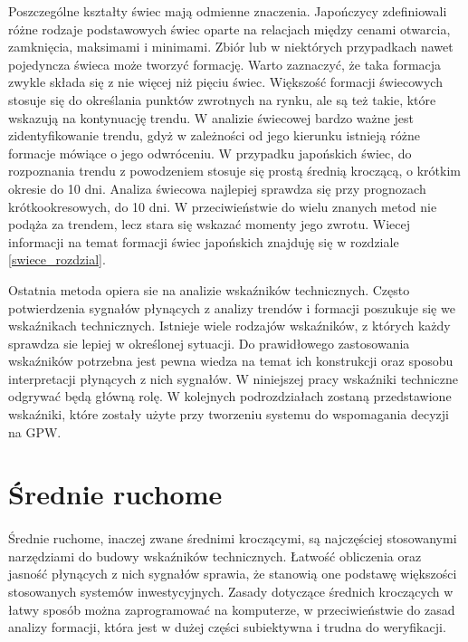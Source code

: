 \documentclass[pdflatex,11pt]{aghdpl}
\begin{document}
Poszczególne kształty świec mają odmienne znaczenia. Japończycy zdefiniowali różne rodzaje podstawowych świec oparte na relacjach między cenami otwarcia, zamknięcia, maksimami i minimami. Zbiór lub w niektórych przypadkach nawet pojedyncza świeca może tworzyć formację. Warto zaznaczyć, że taka formacja zwykle składa się z nie więcej niż pięciu świec. Większość formacji świecowych stosuje się do określania punktów zwrotnych na rynku, ale są też takie, które wskazują na kontynuację trendu. W analizie świecowej bardzo ważne jest zidentyfikowanie trendu, gdyż w zależności od jego kierunku istnieją różne formacje mówiące o jego odwróceniu. W przypadku japońskich świec, do rozpoznania trendu z powodzeniem stosuje się prostą średnią kroczącą, o krótkim okresie do 10 dni. Analiza świecowa najlepiej sprawdza się przy prognozach krótkookresowych, do 10 dni. W przeciwieństwie do wielu znanych metod nie podąża za trendem, lecz stara się wskazać momenty jego zwrotu. Wiecej informacji na temat formacji świec japońskich znajduję się w rozdziale \ref{swiece_rozdzial}.

Ostatnia metoda opiera sie na analizie wskaźników technicznych. Często potwierdzenia sygnałów płynących z analizy trendów i formacji poszukuje się we wskaźnikach technicznych. Istnieje wiele rodzajów wskaźników, z których każdy sprawdza sie lepiej w określonej sytuacji. Do prawidłowego zastosowania wskaźników potrzebna jest pewna wiedza na temat ich konstrukcji oraz sposobu interpretacji płynących z nich sygnałów. W niniejszej pracy wskaźniki techniczne odgrywać będą główną rolę. W kolejnych podrozdziałach zostaną przedstawione wskaźniki, które zostały użyte przy tworzeniu systemu do wspomagania decyzji na GPW. 
\section{Średnie ruchome}
\label{sec:srednie}
\paragraph{}
Średnie ruchome, inaczej zwane średnimi kroczącymi, są najczęściej stosowanymi narzędziami do budowy wskaźników technicznych. Łatwość obliczenia oraz jasność płynących z nich sygnałów sprawia, że stanowią one podstawę większości stosowanych systemów inwestycyjnych. Zasady dotyczące średnich kroczących w łatwy sposób można zaprogramować na komputerze, w przeciwieństwie do zasad analizy formacji, która jest w dużej części subiektywna i trudna do weryfikacji. 
\end{document}
